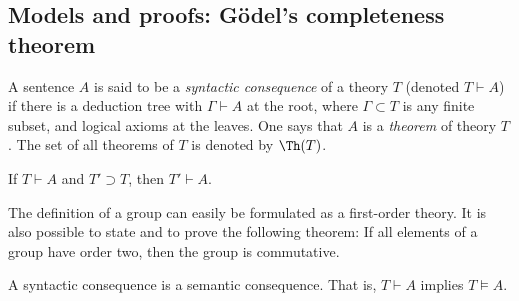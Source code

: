 \begin{page}
\setcounter{section}{3}
\setcounter{subsection}{2}
\setcounter{dfn}{13}
\label{portion:698}

\subsection{Models and proofs: G\"odel's completeness theorem}

\end{page}

\begin{page}
\setcounter{section}{3}
\setcounter{subsection}{2}
\setcounter{dfn}{14}
\label{portion:700}

\begin{dfn}
A sentence $A$ is said to be a \emph{syntactic consequence} of a theory $T$ (denoted $T \vdash A$) if
there is a deduction tree with $\Gamma \vdash A$ at the root, where $\Gamma \subset T$ is any finite subset, and logical axioms at the leaves.
One says that $A$ is a \emph{theorem} of theory $T$.
The set of all theorems of $T$ is denoted by $\Th(T)$.
\end{dfn}

\end{page}

\begin{page}
\setcounter{section}{3}
\setcounter{subsection}{2}
\setcounter{dfn}{15}
\label{portion:703}

\begin{exc}
If $T \vdash A$ and $T' \supset T$, then $T' \vdash A$.
\end{exc}

\end{page}

\begin{page}
\setcounter{section}{3}
\setcounter{subsection}{2}
\setcounter{dfn}{16}
\label{portion:706}

\begin{exl}
The definition of a group can easily be formulated as a first-order theory.
It is also possible to state and to prove the following theorem:
If all elements of a group have order two, then the group is commutative.
\end{exl}

\end{page}

\begin{page}
\setcounter{section}{3}
\setcounter{subsection}{2}
\setcounter{dfn}{17}
\label{portion:709}

\begin{lem}
A syntactic consequence is a semantic consequence.
That is, $T \vdash A$ implies $T \vDash A$.
\end{lem}

\end{page}

